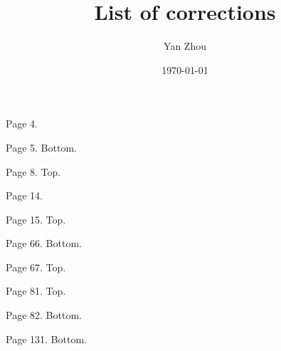 \documentclass[11pt, fontset=Scala]{marticle}
\title{List of corrections}
\author{Yan Zhou}
\date{\today}
\begin{document}
\maketitle

Page 4.

Page 5. Bottom.

Page 8. Top.

Page 14.

Page 15. Top.

Page 66. Bottom.

Page 67. Top.

Page 81. Top.

Page 82. Bottom.

Page 131. Bottom.
\end{document}
